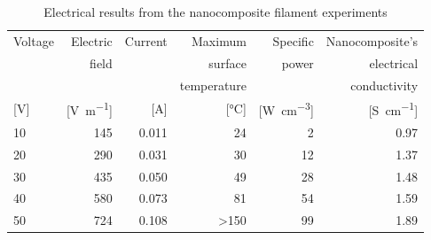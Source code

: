 \documentclass[11pt,review,times]{elsarticle}
\begin{document}
\begin{table}[h]
\centering
\begin{tabular}{@{}lrrrrr@{}}
\toprule
Voltage 			& Electric					& Current 			& Maximum  					& Specific   						& Nanocomposite's \\ 
 					& field						&  						& surface 					& power   							& electrical \\ 
 					& 								&  						& temperature 				&    									& conductivity \\
{[}\si{\V}{]} 	& {[}\si{\V\per\m}{]} 	& {[}\si{\A}{]} 	& {[}\si{\celsius}{]} 	& {[}\si{\W\per\cubic\cm}{]}	& {[}\si{\siemens\per\cm}{]} \\ \midrule
10 					& 145							& 0.011 				& 24 							& 2		  								& 0.97 \\
20					& 290							& 0.031 				& 30 							& 12	 								& 1.37 \\
30 					& 435							& 0.050 				& 49 							& 28	 								& 1.48 \\
40 					& 580							& 0.073 				& 81 							& 54	 								& 1.59 \\
50 					& 724							& 0.108 				& \textgreater 150 		& 99	 								& 1.89 \\ \bottomrule
\end{tabular}%
\caption{Electrical results from the nanocomposite filament experiments}
\label{tab:results_lab}
\end{table}

\begin{table}[H]
\centering
{}
\caption{SLS tests and fractography analysis reported as average values $\pm$ standard deviation}
\label{tab:SLS_and_fractography_results}
\end{table}
\end{document}

